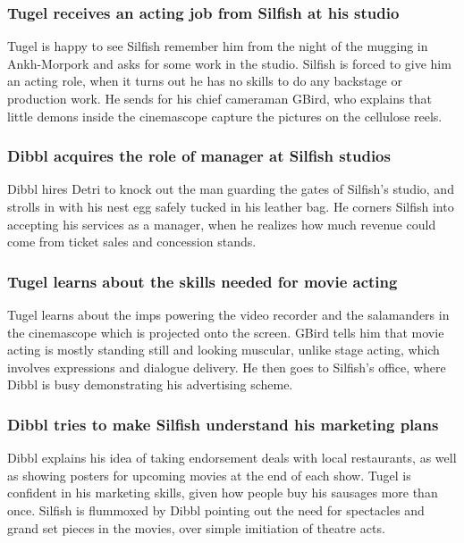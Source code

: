 \subsubsection{\Gls{Tugel} receives an acting job from \Gls{Silfish} at his studio}
\Gls{Tugel} is happy to see \Gls{Silfish} remember him from the night of the mugging in Ankh-Morpork
and asks for some work in the studio. \Gls{Silfish} is forced to give him an acting role, when it
turns out he has no skills to do any backstage or production work. He sends for his chief cameraman
\Gls{GBird}, who explains that little demons inside the cinemascope capture the pictures on the
cellulose reels.

\subsubsection{\Gls{Dibbl} acquires the role of manager at \Gls{Silfish} studios}
\Gls{Dibbl} hires \Gls{Detri} to knock out the man guarding the gates of \Gls{Silfish}'s studio, and
strolls in with his nest egg safely tucked in his leather bag. He corners \Gls{Silfish} into
accepting his services as a manager, when he realizes how much revenue could come from ticket sales
and concession stands.

\subsubsection{\Gls{Tugel} learns about the skills needed for movie acting}
\Gls{Tugel} learns about the imps powering the video recorder and the salamanders in the cinemascope
which is projected onto the screen. \Gls{GBird} tells him that movie acting is mostly standing
still and looking muscular, unlike stage acting, which involves expressions and dialogue delivery.
He then goes to \Gls{Silfish}'s office, where \Gls{Dibbl} is busy demonstrating his advertising
scheme.

\subsubsection{\Gls{Dibbl} tries to make \Gls{Silfish} understand his marketing plans}
\Gls{Dibbl} explains his idea of taking endorsement deals with local restaurants, as well as showing
posters for upcoming movies at the end of each show. \Gls{Tugel} is confident in his marketing
skills, given how people buy his sausages more than once. \Gls{Silfish} is flummoxed by \Gls{Dibbl}
pointing out the need for spectacles and grand set pieces in the movies, over simple imitiation of
theatre acts.

